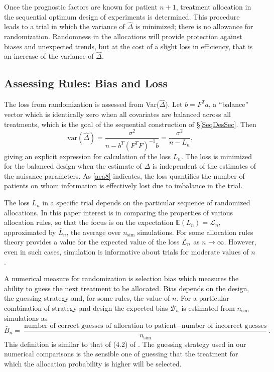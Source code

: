 \documentclass[number,12pt,review]{elsarticle}
\begin{document}
Once the prognostic factors are known for patient $n+1$,  treatment allocation in the sequential optimum design of experiments is determined. This procedure leads to a trial in which the variance of $\hat{\Delta}$ is minimized; there is no allowance for randomization. Randomness in the allocations will provide protection against biases and unexpected trends, but at the cost of a slight loss in efficiency, that is an increase  of the variance of $\hat{\Delta}$.

\subsection{Assessing Rules: Bias and Loss}

\label{BiasLossSec}

The loss from randomization is assessed  from Var($\hat{\Delta}$). Let $b = F^Ta$, a
``balance'' vector which is identically zero when all
covariates are balanced across all treatments, which is the goal of the sequential construction of \S\ref{SeqDesSec}. Then
\begin{equation}
\mbox{var} (\hat{\Delta}) = \frac{\sigma^2}{n - b^T(F^TF)^{-1}b}
= \frac{\sigma^2}{n - {L}_n},
\label{aca8}
\end{equation}
giving an explicit expression for calculation of the loss $L_n$.  The loss is minimized for the balanced design when the estimate of $\Delta$  is independent of the estimates of the nuisance parameters. As \eqref{aca8} indicates, the loss quantifies the number of patients on whom information is effectively lost due to imbalance in the trial.

The loss $L_n$  in a specific trial depends on the particular sequence of randomized allocations. In this paper interest is in comparing the properties of various allocation rules, so that the focus is on  the expectation $\mathbb{E}(L_n) = {\mathcal{L}}_n$, approximated by $\bar{L}_n$, the average over $n_{\mbox{sim}}$ simulations. For some allocation rules theory provides a value for the expected value of the loss ${\cal L}_n $  as $n \rightarrow \infty$. However, even in such cases, simulation is informative about trials for moderate values of $n$.

A numerical measure for randomization is selection bias \citep{b+h:57} which measures the ability to guess the next treatment to be allocated. Bias depends on the design, the guessing strategy and, for some rules, the value of $n$. For a particular combination of strategy and design the expected bias ${\mathcal{B}}_n$ is estimated from
$n_{\mbox{sim}}$ simulations as
\begin{equation}
{\bar{B}}_n = \frac{\mbox{number of correct guesses of allocation to patient}- \mbox{number of incorrect guesses}}{n_{\mbox{sim}}}. \label{biasn}
\end{equation}
This definition is similar to that of (4.2) of \citet{rls:84b}.
The guessing strategy used in our numerical comparisons  is the sensible one of guessing that the treatment for which the
allocation probability is higher will be selected.
\end{document}
